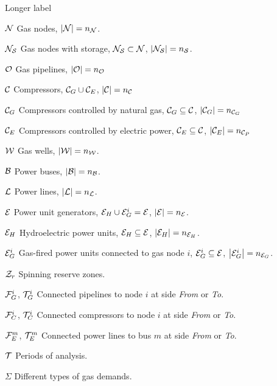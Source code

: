 \begin{labeling}{Longer label\quad}
\item [$\cal{N}$] Gas nodes, $\left| \cal{N} \right|= n_{\cal{N}}$.
\item [$\cal{N}_{S}$] Gas nodes with storage, $\cal{N}_{S} \subset \cal{N} $, $\left| \cal{N}_{S} \right|= n_{\cal{S}}$.
\item [${\cal{O}}$] Gas pipelines, $\left| \cal{O}  \right| = n_{\cal{O}}$
\item [${\cal{C}}$] Compressors, ${\cal{C}}_{G} \cup {\cal{C}}_{E}$, $\left| \cal{C}  \right| = n_{\cal{C}}$ 
\item [${\cal{C}}_{G}$] Compressors controlled by natural gas, ${\cal{C}}_{G} \subseteq {\cal{C}}$, $\left| {\cal{C}}_{G}  \right| = n_{{\cal{C}}_{G}}$ 
\item [${\cal{C}}_{E}$] Compressors controlled by electric power, ${\cal{C}}_{E} \subseteq {\cal{C}}$, $\left| {\cal{C}}_{E}  \right| = n_{{\cal{C}}_{P}}$ 
\item [${\cal{W}}$] Gas wells, $\left| \cal{W} \right|= n_{\cal{W}}$.
\item [$\cal{B}$] Power buses, $\left| \cal{B} \right|= n_{\cal{B}}$.
\item [$\cal{L}$] Power lines, $\left| \cal{L} \right|= n_{\cal{L}}$.
\item [$\cal{E}$] Power unit generators, ${\cal{E}}_{H} \cup {\cal{E}}_{G}^{i} =\cal{E}$, $\left| \cal{E} \right|= n_{\cal{E}}$.
\item [${\cal{E}}_{H}$] Hydroelectric power units, ${\cal{E}}_{H} \subseteq \cal{E} $, $\left| {\cal{E}}_{H} \right|= n_{{\cal{E}}_{H}}$.
\item [${\cal{E}}^{i}_{G}$] Gas-fired power units connected to gas node $i$, \break ${\cal{E}}^{i}_{G} \subseteq \cal{E}$, $\left| {\cal{E}}^{i}_{G} \right|= n_{{\cal{E}}_{G}}$.
\item [${\cal{Z}}_{r}$] Spinning reserve zones. 
\item [${\cal{F}}^{i}_{G}$, ${\cal{T}}^{i}_{G}$] Connected pipelines to node $i$ at side \textit{From} or \textit{To}.
\item [${\cal{F}}^{i}_{C}$, ${\cal{T}}^{i}_{C}$] Connected compressors to node $i$ at side \textit{From} or \textit{To}.
\item [${\cal{F}}^{m}_{E}$, ${\cal{T}}^{m}_{E}$] Connected power lines to bus $m$ at side \textit{From} or \textit{To}. 
\item [$\cal{T}$] Periods of analysis.
\item [$\Sigma$] Different types of gas demands.
\end{labeling}

